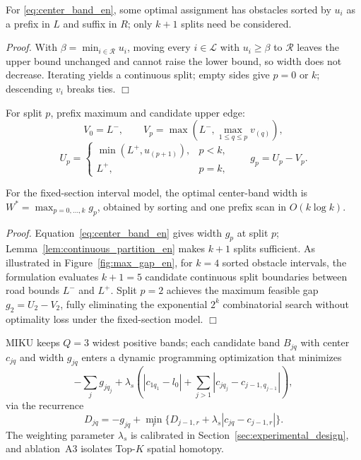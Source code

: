 \begin{lemma}
\label{lem:continuous_partition_en}
For \eqref{eq:center_band_en}, some optimal assignment has obstacles sorted by $u_i$ as a prefix in $L$ and suffix in $R$; only $k+1$ splits need be considered.
\end{lemma}

\emph{Proof.} With $\beta=\min_{i\in\mathcal{R}}u_i$, moving every $i\in\mathcal{L}$ with $u_i\geq\beta$ to $\mathcal{R}$ leaves the upper bound unchanged and cannot raise the lower bound, so width does not decrease. Iterating yields a continuous split; empty sides give $p=0$ or $k$; descending $v_i$ breaks ties. \hfill$\Box$

For split $p$, prefix maximum and candidate upper edge:
\begin{equation}
 V_0=L^-,\qquad V_p=\max\left(L^-,\max_{1\leq q\leq p}v_{(q)}\right),
 \label{eq:prefix_v_en}
\end{equation}
\begin{equation}
 U_p=\begin{cases}\min(L^+,u_{(p+1)}),&p<k,\\L^+,&p=k,\end{cases}\qquad g_p=U_p-V_p.
 \label{eq:gap_def_en}
\end{equation}

\begin{theorem}
\label{thm:max_gap_en}
For the fixed-section interval model, the optimal center-band width is $W^*=\max_{p=0,\ldots,k}g_p$, obtained by sorting and one prefix scan in $O(k\log k)$.
\end{theorem}

\emph{Proof.} Equation~\ref{eq:center_band_en} gives width $g_p$ at split $p$; Lemma~\ref{lem:continuous_partition_en} makes $k+1$ splits sufficient. As illustrated in Figure~\ref{fig:max_gap_en}, for $k=4$ sorted obstacle intervals, the formulation evaluates $k+1=5$ candidate continuous split boundaries between road bounds $L^-$ and $L^+$. Split $p=2$ achieves the maximum feasible gap $g_2 = U_2 - V_2$, fully eliminating the exponential $2^k$ combinatorial search without optimality loss under the fixed-section model. \hfill$\Box$

MIKU keeps $Q=3$ widest positive bands; each candidate band $B_{jq}$ with center $c_{jq}$ and width $g_{jq}$ enters a dynamic programming optimization that minimizes
\begin{equation}
 -\sum_jg_{jq_j}+\lambda_s\left(|c_{1q_1}-l_0|+\sum_{j>1}|c_{jq_j}-c_{j-1,q_{j-1}}|\right),
 \label{eq:spatial_homotopy_en}
\end{equation}
via the recurrence
\begin{equation}
 D_{jq}=-g_{jq}+\min_r\{D_{j-1,r}+\lambda_s|c_{jq}-c_{j-1,r}|\}.
 \label{eq:spatial_dp_en}
\end{equation}
The weighting parameter $\lambda_s$ is calibrated in Section~\ref{sec:experimental_design}, and ablation~A3 isolates Top-$K$ spatial homotopy.

